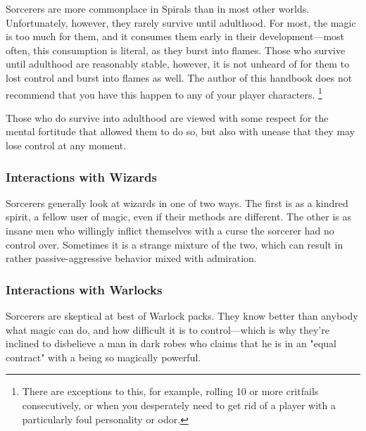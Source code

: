 \begin{multicols}{2}
Sorcerers are more commonplace in Spirals than in most other worlds.
Unfortunately, however, they rarely survive until adulthood.
For most, the magic is too much for them, and it consumes them early in their development---most often, this consumption is literal, as they burst into flames.
Those who survive until adulthood are reasonably stable, however, it is not unheard of for them to lost control and burst into flames as well.
The author of this handbook does not recommend that you have this happen to any of your player characters.
\footnote{There are exceptions to this, for example, rolling 10 or more critfails consecutively, or when you desperately need to get rid of a player with a particularly foul personality or odor.}

Those who do survive into adulthood are viewed with some respect for the mental fortitude that allowed them to do so, but also with unease that they may lose control at any moment.

\subsubsection{Interactions with Wizards}
Sorcerers generally look at wizards in one of two ways.
The first is as a kindred spirit, a fellow user of magic, even if their methods are different.
The other is as insane men who willingly inflict themselves with a curse the sorcerer had no control over.
Sometimes it is a strange mixture of the two, which can result in rather passive-aggressive behavior mixed with admiration.

\subsubsection{Interactions with Warlocks}
Sorcerers are skeptical at best of Warlock packs.
They know better than anybody what magic can do, and how difficult it is to control---which is why they're inclined to disbelieve a man in dark robes who claims that he is in an "equal contract" with a being so magically powerful.


\end{multicols}